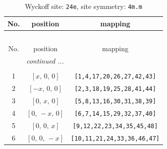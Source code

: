 \documentclass[fleqn,8pt]{jsarticle}
\begin{document}
\renewcommand{\arraystretch}{1.2}
\begin{longtable}{ccc}
\caption{Wyckoff site: {\tt 24e}, site symmetry: {\tt 4m.m}}
 \\
 \hline \hline
No. & position & mapping \\ \hline \endfirsthead

\multicolumn{2}{l}{\tablename\ \thetable{}} \\
 \hline \hline
No. & position & mapping \\ \hline \endhead

 \hline \hline
\multicolumn{2}{r}{\footnotesize\it continued ...} \\ \endfoot

 \hline \hline
\multicolumn{2}{r}{} \\ \endlastfoot

1 & $\left[ x,\, 0,\, 0 \right]$ & {\tt [1,4,17,20,26,27,42,43]} \\ \hline
2 & $\left[ - x,\, 0,\, 0 \right]$ & {\tt [2,3,18,19,25,28,41,44]} \\ \hline
3 & $\left[ 0,\, x,\, 0 \right]$ & {\tt [5,8,13,16,30,31,38,39]} \\ \hline
4 & $\left[ 0,\, - x,\, 0 \right]$ & {\tt [6,7,14,15,29,32,37,40]} \\ \hline
5 & $\left[ 0,\, 0,\, x \right]$ & {\tt [9,12,22,23,34,35,45,48]} \\ \hline
6 & $\left[ 0,\, 0,\, - x \right]$ & {\tt [10,11,21,24,33,36,46,47]} \\
\end{longtable}
\renewcommand{\arraystretch}{1.2}
\end{document}
